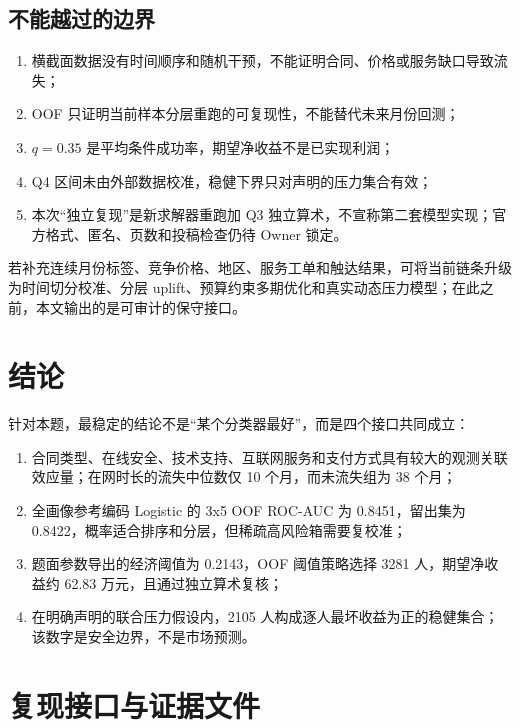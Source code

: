 \documentclass[UTF8,a4paper,11pt]{ctexart}
\begin{document}
\subsection{不能越过的边界}
\begin{enumerate}[label=\arabic*.,leftmargin=2.5em]
  \item 横截面数据没有时间顺序和随机干预，不能证明合同、价格或服务缺口导致流失；
  \item OOF 只证明当前样本分层重跑的可复现性，不能替代未来月份回测；
  \item \(q=0.35\) 是平均条件成功率，期望净收益不是已实现利润；
  \item Q4 区间未由外部数据校准，稳健下界只对声明的压力集合有效；
  \item 本次“独立复现”是新求解器重跑加 Q3 独立算术，不宣称第二套模型实现；官方格式、匿名、页数和投稿检查仍待 Owner 锁定。
\end{enumerate}

若补充连续月份标签、竞争价格、地区、服务工单和触达结果，可将当前链条升级为时间切分校准、分层 uplift、预算约束多期优化和真实动态压力模型；在此之前，本文输出的是可审计的保守接口。

\section{结论}
\label{sec:conclusion-v2}

针对本题，最稳定的结论不是“某个分类器最好”，而是四个接口共同成立：
\begin{enumerate}[label=\textbf{结论\arabic*}.,leftmargin=2.8em]
  \item 合同类型、在线安全、技术支持、互联网服务和支付方式具有较大的观测关联效应量；在网时长的流失中位数仅 10 个月，而未流失组为 38 个月；
  \item 全画像参考编码 Logistic 的 3x5 OOF ROC-AUC 为 0.8451，留出集为 0.8422，概率适合排序和分层，但稀疏高风险箱需要复校准；
  \item 题面参数导出的经济阈值为 0.2143，OOF 阈值策略选择 3281 人，期望净收益约 62.83 万元，且通过独立算术复核；
  \item 在明确声明的联合压力假设内，2105 人构成逐人最坏收益为正的稳健集合；该数字是安全边界，不是市场预测。
\end{enumerate}

\appendix
\section{复现接口与证据文件}
\label{app:repro-v2}
\end{document}

